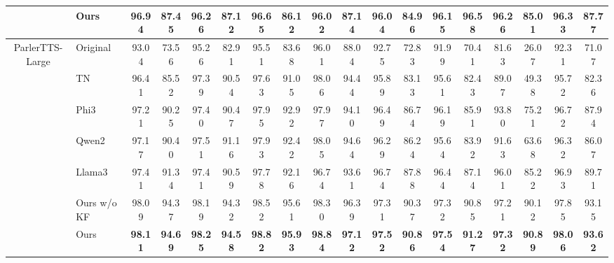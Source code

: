 \documentclass[11pt]{article}
\begin{document}
\begin{table}[tb]
{\begin{tabular}{clcccccccccccccccc}
				& Ours                    & \textbf{96.94} & \textbf{87.45} & \textbf{96.26} & \textbf{87.12} & \textbf{96.65} & \textbf{86.12} & \textbf{96.02} & \textbf{87.14} & \textbf{96.04} & \textbf{84.96} & \textbf{96.15} & \textbf{96.58} & \textbf{96.26} & \textbf{85.01} & \textbf{96.33} & \textbf{87.77} \\
				\midrule
				\multirow{7}{*}{ParlerTTS-Large} & Original                & 93.04          & 73.56          & 95.26          & 82.91          & 95.51          & 83.68          & 96.01          & 88.04          & 92.75          & 72.83          & 91.99          & 70.41          & 81.63          & 26.07          & 92.31          & 71.07          \\
				& TN                      & 96.41          & 85.52          & 97.39          & 90.54          & 97.63          & 91.05          & 98.06          & 94.44          & 95.89          & 83.13          & 95.61          & 82.43          & 89.07          & 49.38          & 95.72          & 82.36          \\
				& Phi3                    & 97.21          & 90.25          & 97.40          & 90.47          & 97.95          & 92.92          & 97.97          & 94.10          & 96.49          & 86.74          & 96.19          & 85.91          & 93.80          & 75.21          & 96.72          & 87.94          \\
				& Qwen2                   & 97.17          & 90.40          & 97.51          & 91.16          & 97.93          & 92.42          & 98.05          & 94.64          & 96.29          & 86.24          & 95.64          & 83.92          & 91.63          & 63.68          & 96.32          & 86.07          \\
				& Llama3                  & 97.41          & 91.34          & 97.41          & 90.59          & 97.78          & 92.16          & 96.74          & 93.61          & 96.74          & 87.88          & 96.44          & 87.14          & 96.01          & 85.22          & 96.93          & 89.71          \\
				& Ours w/o KF             & 98.09          & 94.37          & 98.19          & 94.32          & 98.52          & 95.61          & 98.30          & 96.39          & 97.31          & 90.37          & 97.32          & 90.85          & 97.21          & 90.12          & 97.85          & 93.15          \\
				& Ours                    & \textbf{98.11} & \textbf{94.69} & \textbf{98.25} & \textbf{94.58} & \textbf{98.82} & \textbf{95.93} & \textbf{98.84} & \textbf{97.12} & \textbf{97.52} & \textbf{90.86} & \textbf{97.54} & \textbf{91.27} & \textbf{97.32} & \textbf{90.89} & \textbf{98.06} & \textbf{93.62} \\

\end{tabular}}
\end{table}
\end{document}
